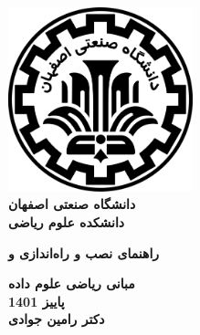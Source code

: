 \begin{titlepage}
\begin{center}
\includegraphics[width=0.4\textwidth]{figures/IUT Logo.png}\\
        
\LARGE
\textbf{دانشگاه صنعتی اصفهان}\\
\textbf{دانشکده علوم ریاضی}\\
        
\vfill
        
\huge
\textbf{راهنمای نصب و راه‌اندازی  و }\\
        
\vfill
        
\LARGE
\textbf{مبانی ریاضی علوم داده}\\
\textbf{پاییز 1401}\\
\textbf{دکتر رامین جوادی}\\
\end{center}
\end{titlepage}
